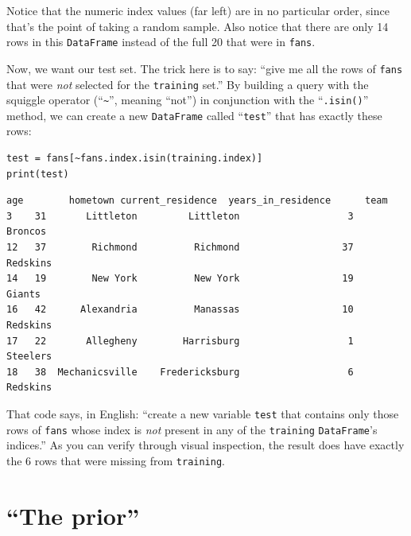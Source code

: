 Notice that the numeric index values (far left) are in no particular order,
since that's the point of taking a random sample. Also notice that there are
only 14 rows in this \texttt{DataFrame} instead of the full 20 that were in
\texttt{fans}.


Now, we want our test set. The trick here is to say: ``give me all the rows of
\texttt{fans} that were \textit{not} selected for the \texttt{training} set.''
By building a query with the squiggle operator (``\texttt{\textasciitilde}'',
meaning ``not'') in conjunction with the ``\texttt{.isin()}'' method, we can
create a new \texttt{DataFrame} called ``\texttt{test}'' that has exactly these
rows:

\begin{Verbatim}[fontsize=\small,samepage=true,frame=single,framesep=3mm]
test = fans[~fans.index.isin(training.index)]
print(test)
\end{Verbatim}
\vspace{-.2in}

\begin{Verbatim}[fontsize=\small,samepage=true,frame=leftline,framesep=5mm,framerule=1mm]
    age        hometown current_residence  years_in_residence      team
3    31       Littleton         Littleton                   3   Broncos
12   37        Richmond          Richmond                  37  Redskins
14   19        New York          New York                  19    Giants
16   42      Alexandria          Manassas                  10  Redskins
17   22       Allegheny        Harrisburg                   1  Steelers
18   38  Mechanicsville    Fredericksburg                   6  Redskins
\end{Verbatim}

That code says, in English: ``create a new variable \texttt{test} that contains
only those rows of \texttt{fans} whose index is \textit{not} present in any of
the \texttt{training} \texttt{DataFrame}'s indices.'' As you can verify through
visual inspection, the result does have exactly the 6 rows that were missing
from \texttt{training}.

\section{``The prior''}

